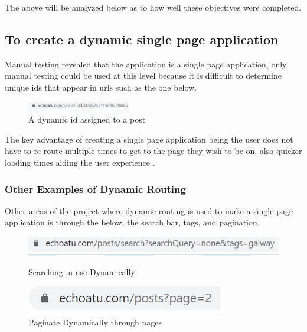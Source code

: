 The above will be analyzed below as to how well these objectives were completed.

\subsection{To create a dynamic single page application}
Manual testing revealed that the application is a single page application, only manual testing could be used at this level because it is difficult to determine unique ids that appear in urls such as the one below.
\begin{figure}[h!]
    \centering
    \includegraphics[width=0.4\textwidth]{images/id.png}
    \caption{A dynamic id assigned to a post}
    \label{image:id}
\end{figure}
The key advantage of creating a single page application being the user does not have to re route multiple times to get to the page they wish to be on, also quicker loading times aiding the user experience \cite{jadhav2015single}.

\subsubsection{Other Examples of Dynamic Routing}
Other areas of the project where dynamic routing is used to make a single page application is through the below, the search bar, tags, and pagination.

\begin{figure}[ht]
\begin{minipage}[b]{0.5\linewidth}
    \centering
    \includegraphics[width=\linewidth]{images/searchtag}
    \caption{Searching in use Dynamically}
    \label{image:searchtag}
\end{minipage}
    \hspace{0.5cm}
    \begin{minipage}[b]{0.3\linewidth}
    \centering
   \includegraphics[width=\linewidth]{images/PaginationRoute}
    \caption{Paginate Dynamically through pages}
\end{minipage}
\end{figure}

